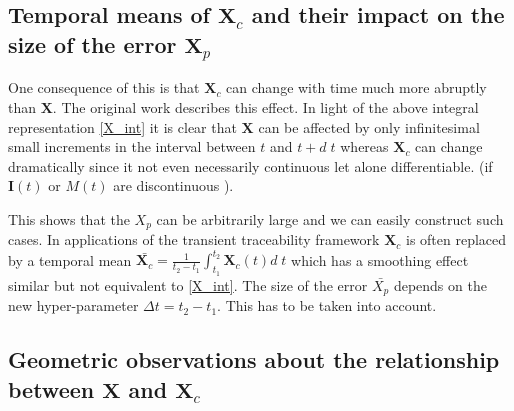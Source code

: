 \documentclass[journal abbreviation, manuscript]{copernicus}
\theoremstyle{definition}
\newcommand{\X}{\mathbf{X}}
\newcommand{\I}{\mathbf{I}}
\begin{document}
\subsection{Temporal means of $\X_c$ and their impact on the size of the error $\X_p$}

One consequence of this is that $\X_c$ can change with time much more abruptly than $\X$. 
The original work \citep[p. 152 Fig. 5]{Luo2017Biogeosciences} describes this effect. 
In light of the above integral representation \eqref{X_int} it is clear that
$\X$ can be affected by only infinitesimal small increments in the interval
between $t$ and $t+d\;t$ whereas $\X_c$ can change dramatically since it not even necessarily continuous let alone differentiable.
(if $\I(t)$ or $M(t)$ are discontinuous ).

This shows that the $X_p$ can be arbitrarily large and we can easily construct such cases.
In applications of the transient traceability framework $\X_c$ is often
replaced by a temporal mean $\bar{\X_c} = \frac{1}{t_2-t_1}\int_{t_1}^{t_2}
\X_c(t) d\;t$ which has a smoothing effect similar but not equivalent to \eqref{X_int}.
The size of the error $\bar{X_p}$ depends on the new hyper-parameter $\Delta t= t_2-t_1$.
This has to be taken into account.



\subsection{Geometric observations about the relationship between $\X$ and $\X_c$} 
\end{document}
